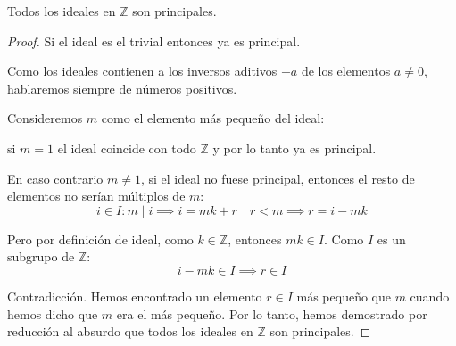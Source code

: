 \begin{thm}
    Todos los ideales en $\mathbb{Z}$ son principales.
\end{thm}

\begin{proof}
    Si el ideal es el trivial entonces ya es principal.

    Como los ideales contienen a los inversos aditivos $-a$ de los elementos $a\neq 0$, hablaremos siempre de números positivos.

    Consideremos $m$ como el elemento más pequeño del ideal:

    si $m=1$ el ideal coincide con todo $\mathbb{Z}$ y por lo tanto ya es principal.

    En caso contrario $m\neq 1$, si el ideal no fuese principal, entonces el resto de elementos no serían múltiplos de $m$:
    \begin{equation}
        i \in I: m \mid i \implies i = mk + r \quad r < m \implies r = i - mk
    \end{equation}

    Pero por definición de ideal, como $k \in \mathbb{Z}$, entonces $mk \in I$. Como $I$ es un subgrupo de $\mathbb{Z}$:
    \begin{equation}
        i - mk \in I \implies r \in I
    \end{equation}

    Contradicción. Hemos encontrado un elemento $r \in I$ más pequeño que $m$ cuando hemos dicho que $m$ era el más pequeño. Por lo tanto, hemos demostrado por reducción al absurdo que todos los ideales en $\mathbb{Z}$ son principales.
\end{proof}
